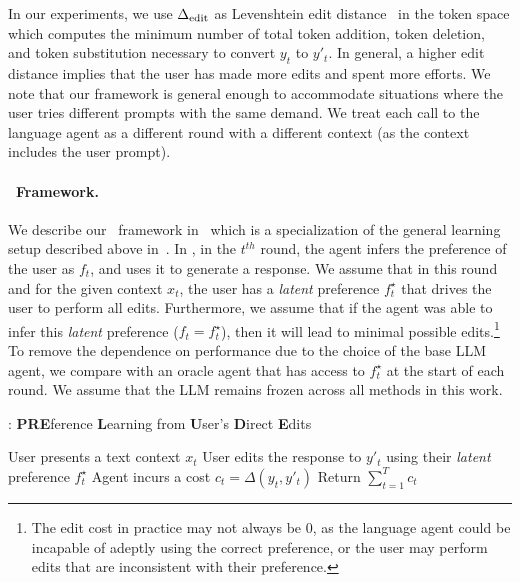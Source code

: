 In our experiments, we use $\Delta_{\textrm{edit}}$ as Levenshtein edit distance~\citep{Levenshtein1965BinaryCC} in the token space which computes the minimum number of total token addition, token deletion, and token substitution necessary to convert $y_t$ to $y'_t$. In general, a higher edit distance implies that the user has made more edits and spent more efforts. We note that our framework is general enough to accommodate situations where the user tries different prompts with the same demand. We treat each call to the language agent as a different round with a different context (as the context includes the user prompt).


\paragraph{\framework~Framework.} We describe our \framework~framework in~ which is a specialization of the general learning setup described above in~. In \framework, in the $t^{th}$ round, the agent infers the preference of the user as $f_t$, and uses it to generate a response. We assume that in this round and for the given context $x_t$, the user has a \emph{latent} preference $f^\star_t$ that drives the user to perform all edits. Furthermore, we assume that if the agent was able to infer this \emph{latent} preference ($f_t = f^\star_t$), then it will lead to minimal possible edits.\footnote{The edit cost in practice may not always be 0, as the language agent could be incapable of adeptly using the correct preference, or the user may perform edits that are inconsistent with their preference.} To remove the dependence on performance due to the choice of the base LLM agent, we compare with an oracle agent that has access to $f^\star_t$ at the start of each round. We assume that the LLM remains frozen across all methods in this work.



\begin{protocol}[h!]
\caption{\textbf{\framework}: \textbf{PRE}ference \textbf{L}earning from \textbf{U}ser's \textbf{D}irect \textbf{E}dits}
    \begin{algorithmic}[1]
        \State User presents a text context $x_t$
        \State {} 
        \State {}
        \State User edits the response to $y'_t$ using their \emph{latent} preference $f^\star_t$
        \State Agent incurs a cost $c_t = \Delta(y_t, y'_t)$
        \EndFor
        \State Return $\sum_{t=1}^T c_t$
    \end{algorithmic}
    \label{proto:framework}
\end{protocol}


